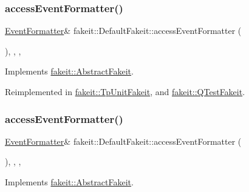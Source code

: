 \subsubsection{\texorpdfstring{accessEventFormatter()}{accessEventFormatter()}\hspace{0.1cm}{\footnotesize\ttfamily [6/9]}}
{\footnotesize\ttfamily \mbox{\hyperlink{structfakeit_1_1EventFormatter}{Event\+Formatter}}\& fakeit\+::\+Default\+Fakeit\+::access\+Event\+Formatter (\begin{DoxyParamCaption}{ }\end{DoxyParamCaption})\hspace{0.3cm}{\ttfamily [inline]}, {\ttfamily [override]}, {\ttfamily [protected]}, {\ttfamily [virtual]}}



Implements \mbox{\hyperlink{classfakeit_1_1AbstractFakeit_a443a7ac12208c55f2ae4fa072e983476}{fakeit\+::\+Abstract\+Fakeit}}.



Reimplemented in \mbox{\hyperlink{classfakeit_1_1TpUnitFakeit_ae0f3713842b30e36ee1b0ce03a070b59}{fakeit\+::\+Tp\+Unit\+Fakeit}}, and \mbox{\hyperlink{classfakeit_1_1QTestFakeit_a3760d57c61ed1572bcf5cded00f643ec}{fakeit\+::\+Q\+Test\+Fakeit}}.

\mbox{\label{classfakeit_1_1DefaultFakeit_a02cb8f08a94e7bf830c87f74f20c9bd9}} 
\subsubsection{\texorpdfstring{accessEventFormatter()}{accessEventFormatter()}\hspace{0.1cm}{\footnotesize\ttfamily [7/9]}}
{\footnotesize\ttfamily \mbox{\hyperlink{structfakeit_1_1EventFormatter}{Event\+Formatter}}\& fakeit\+::\+Default\+Fakeit\+::access\+Event\+Formatter (\begin{DoxyParamCaption}{ }\end{DoxyParamCaption})\hspace{0.3cm}{\ttfamily [inline]}, {\ttfamily [override]}, {\ttfamily [protected]}, {\ttfamily [virtual]}}



Implements \mbox{\hyperlink{classfakeit_1_1AbstractFakeit_a443a7ac12208c55f2ae4fa072e983476}{fakeit\+::\+Abstract\+Fakeit}}.



